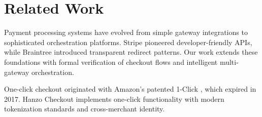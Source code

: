 \section{Related Work}


Payment processing systems have evolved from simple gateway integrations to sophisticated orchestration platforms. Stripe \cite{stripe2018} pioneered developer-friendly APIs, while Braintree \cite{braintree2018} introduced transparent redirect patterns. Our work extends these foundations with formal verification of checkout flows and intelligent multi-gateway orchestration.

One-click checkout originated with Amazon's patented 1-Click \cite{amazon1999}, which expired in 2017. Hanzo Checkout implements one-click functionality with modern tokenization standards and cross-merchant identity.

